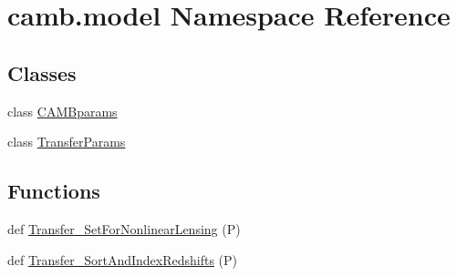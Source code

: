 \hypertarget{namespacecamb_1_1model}{}\section{camb.\+model Namespace Reference}
\label{namespacecamb_1_1model}
\subsection*{Classes}
\begin{DoxyCompactItemize}
\item 
class \mbox{\hyperlink{classcamb_1_1model_1_1CAMBparams}{C\+A\+M\+Bparams}}
\item 
class \mbox{\hyperlink{classcamb_1_1model_1_1TransferParams}{Transfer\+Params}}
\end{DoxyCompactItemize}
\subsection*{Functions}
\begin{DoxyCompactItemize}
\item 
def \mbox{\hyperlink{namespacecamb_1_1model_a74150b9cf84fb82912283d7ae82064b8}{Transfer\+\_\+\+Set\+For\+Nonlinear\+Lensing}} (P)
\item 
def \mbox{\hyperlink{namespacecamb_1_1model_a09fbf081d645ea0f502d2381b47f1d04}{Transfer\+\_\+\+Sort\+And\+Index\+Redshifts}} (P)
\end{DoxyCompactItemize}
